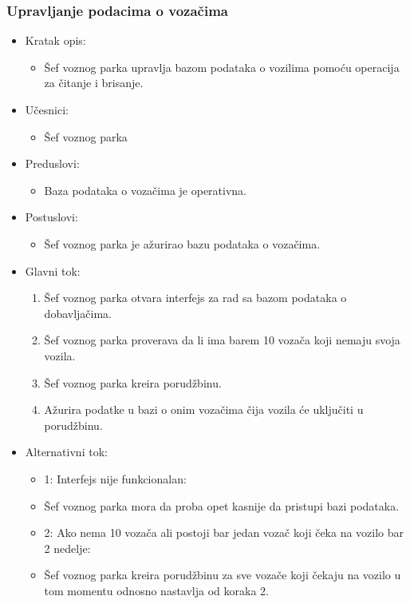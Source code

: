 \subsubsection{\bfseries Upravljanje podacima o vozačima}

\begin{itemize}
	\item Kratak opis:
		\begin{itemize}
			\item Šef voznog parka upravlja bazom podataka o vozilima pomoću operacija za čitanje i brisanje.
		\end{itemize}

	\item Učesnici:
		\begin{itemize}
		    \item Šef voznog parka
		\end{itemize}


	\item Preduslovi:
		\begin{itemize}
		    \item Baza podataka o vozačima je operativna.
		\end{itemize}


	\item Postuslovi:
		\begin{itemize}
			\item Šef voznog parka je ažurirao bazu podataka o vozačima.
	\end{itemize}

	\item Glavni tok:
		\begin{enumerate}
		    \item Šef voznog parka otvara interfejs za rad sa bazom podataka o dobavljačima.
		    \item Šef voznog parka proverava da li ima barem 10 vozača koji nemaju svoja vozila.
		    \item Šef voznog parka kreira porudžbinu.
			\item Ažurira podatke u bazi o onim vozačima čija vozila će uključiti u porudžbinu.
		\end{enumerate}

	\item Alternativni tok:
		\begin{itemize}
		    \item 1: Interfejs nije funkcionalan:
			\item Šef voznog parka mora da proba opet kasnije da pristupi bazi podataka.
			\item 2: Ako nema 10 vozača ali postoji bar jedan vozač koji čeka na vozilo bar 2 nedelje:
			\item Šef voznog parka kreira porudžbinu za sve vozače koji čekaju na vozilo u tom momentu odnosno nastavlja od koraka 2.
		\end{itemize}

\end{itemize}

